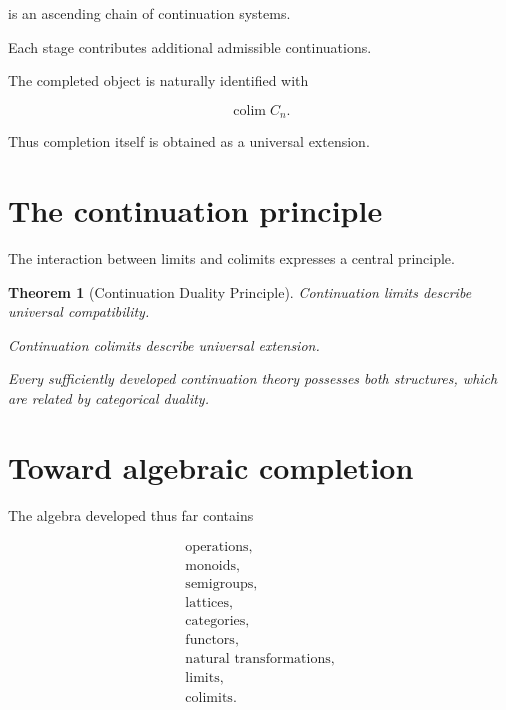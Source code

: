 \documentclass[13pt,openany]{book}
\theoremstyle{plain}
\newtheorem{theorem}{Theorem}[chapter]
\theoremstyle{definition}
\begin{document}
is an ascending chain of continuation systems.

Each stage contributes additional admissible continuations.

The completed object is naturally identified with

\[
\operatorname{colim} C_n.
\]

Thus completion itself is obtained as a universal extension.

\section{The continuation principle}

The interaction between limits and colimits expresses a central principle.

\begin{theorem}[Continuation Duality Principle]
Continuation limits describe universal compatibility.

Continuation colimits describe universal extension.

Every sufficiently developed continuation theory possesses both structures,
which are related by categorical duality.
\end{theorem}

\section{Toward algebraic completion}

The algebra developed thus far contains

\[
\begin{array}{c}
\text{operations},\\
\text{monoids},\\
\text{semigroups},\\
\text{lattices},\\
\text{categories},\\
\text{functors},\\
\text{natural transformations},\\
\text{limits},\\
\text{colimits}.
\end{array}
\]
\end{document}

